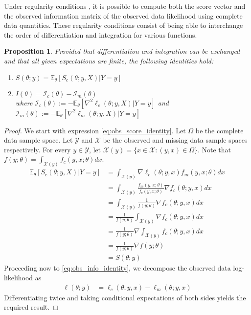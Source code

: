 \documentclass[11pt, oneside]{article}   	%
\newcommand{\bE}{\mathbb{E}}
\newtheorem{proposition}{Proposition}[section]
\begin{document}
Under regularity conditions \citep[see][]{McL08}, it is possible to compute both the score vector and the observed information matrix of the observed data likelihood using complete data quantities. These regularity conditions consist of being able to interchange the order of differentiation and integration for various functions.

\begin{proposition}
    \label{thm2:EM_decomp}
    Provided that differentiation and integration can be exchanged and that all given expectations are finite, the following identities hold:
    \begin{enumerate}[label=(\roman*)]
        \item $S(\theta; y) = \bE_\theta [S_c(\theta; y, X)|Y=y]$ \label{eq:obs_score_identity}
        \item $I(\theta) = \mathcal{I}_c(\theta) - \mathcal{I}_m(\theta)$ \label{eq:obs_info_identity}\\
        where $\mathcal{I}_c(\theta) := - \bE_\theta \left[ \nabla^2 \ell_c(\theta; y, X) | Y=y \right]$ and $\mathcal{I}_m(\theta) := - \bE_\theta \left[ \nabla^2 \ell_m(\theta; y, X) | Y=y \right]$
    \end{enumerate}
\end{proposition}

\begin{proof}
    We start with expression \ref{eq:obs_score_identity}. Let $\Omega$ be the complete data sample space. Let $\mathcal{Y}$ and $\mathcal{X}$ be the observed and missing data sample spaces respectively. For every $y \in \mathcal{Y}$, let $\mathcal{X}(y) = \{ x \in \mathcal{X}: (y,x) \in \Omega\}$. Note that $f(y; \theta) = \int_{\mathcal{X}(y)} f_c(y, x; \theta) dx$.
    \begin{align}
        \bE_\theta [S_c(\theta; y, X)|Y=y] &= \int_{\mathcal{X}(y)} \nabla \ell_c(\theta; y, x) f_m(y, x; \theta) dx \nonumber\\
        &= \int_{\mathcal{X}(y)} \frac{f_m(y, x; \theta)}{f_c(y, x; \theta)} \nabla f_c(\theta; y, x) dx \nonumber\\
        &= \int_{\mathcal{X}(y)} \frac{1}{f(y; \theta)} \nabla f_c(\theta; y, x) dx\nonumber\\
        &= \frac{1}{f(y; \theta)} \int_{\mathcal{X}(y)} \nabla f_c(\theta; y, x) dx\nonumber\\
        &= \frac{1}{f(y; \theta)} \nabla \int_{\mathcal{X}(y)} f_c(\theta; y, x) dx \nonumber\\
        &= \frac{1}{f(y; \theta)} \nabla f(y; \theta)\nonumber\\
        &= S(\theta; y) \nonumber
    \end{align}
    Proceeding now to \ref{eq:obs_info_identity}, we decompose the observed data log-likelihood as
    \begin{align*}
        \ell(\theta; y) &= \ell_c(\theta; y, x) - \ell_m(\theta; y, x)
    \end{align*}
    Differentiating twice and taking conditional expectations of both sides yields the required result.
\end{proof}
\end{document}
